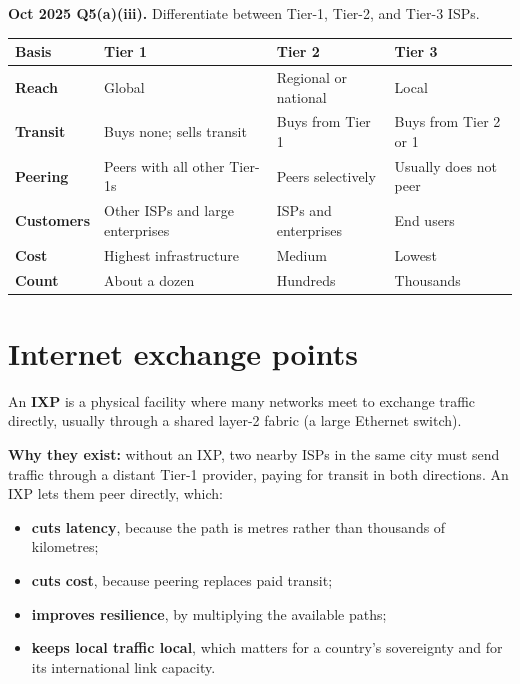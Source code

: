 \documentclass[11pt,a4paper]{article}
\begin{document}
\begin{pyqbox}
\textbf{Oct 2025 Q5(a)(iii).} Differentiate between Tier-1, Tier-2, and Tier-3 ISPs.
\end{pyqbox}

\begin{solbox}
\begin{center}\small
\begin{tabularx}{\textwidth}{>{\bfseries}p{} X X X}
\toprule Basis & Tier 1 & Tier 2 & Tier 3\\
\midrule
Reach & Global & Regional or national & Local\\
Transit & Buys none; sells transit & Buys from Tier 1 & Buys from Tier 2 or 1\\
Peering & Peers with all other Tier-1s & Peers selectively & Usually does not peer\\
Customers & Other ISPs and large enterprises & ISPs and enterprises & End users\\
Cost & Highest infrastructure & Medium & Lowest\\
Count & About a dozen & Hundreds & Thousands\\
\bottomrule
\end{tabularx}
\end{center}
\end{solbox}

\section{Internet exchange points}

An \textbf{IXP} is a physical facility where many networks meet to exchange traffic directly, usually through a shared layer-2 fabric (a large Ethernet switch).

\textbf{Why they exist:} without an IXP, two nearby ISPs in the same city must send traffic through a distant Tier-1 provider, paying for transit in both directions. An IXP lets them peer directly, which:

\begin{itemize}
\item \textbf{cuts latency}, because the path is metres rather than thousands of kilometres;
\item \textbf{cuts cost}, because peering replaces paid transit;
\item \textbf{improves resilience}, by multiplying the available paths;
\item \textbf{keeps local traffic local}, which matters for a country's sovereignty and for its international link capacity.
\end{itemize}
\end{document}
